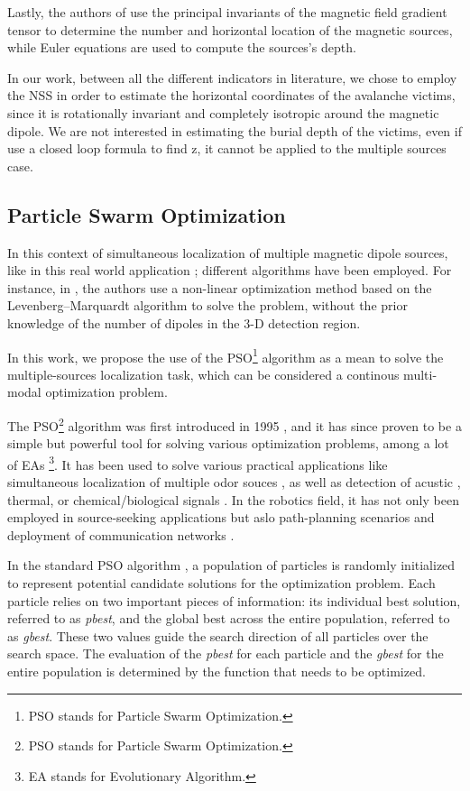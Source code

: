 Lastly, the authors of \cite{multiple_spacecraft} use 
the principal invariants of the magnetic field gradient tensor
to determine the number and horizontal location of the magnetic sources, 
while Euler equations are used to compute the sources's depth.

In our work, between all the different indicators in literature,
we chose to employ the NSS in order to estimate the 
horizontal coordinates of the avalanche victims, 
since it is rotationally invariant and completely isotropic 
around the magnetic dipole.
We are not interested in estimating the burial depth of the victims,
even if \cite{not_import_formula_z} use a closed loop formula to find z,
it cannot be applied to the multiple sources case.


\subsection{Particle Swarm Optimization}
In this context of simultaneous localization of multiple magnetic 
dipole sources, like in this real world application \cite{real_application}; 
different algorithms have been employed.
For instance, in \cite{DetectionMultiplMagnetiDipoleSources}, the authors
use a non-linear optimization method based on the Levenberg–Marquardt algorithm
to solve the problem, without the prior knowledge of the number of 
dipoles in the 3-D detection region.

In this work, we propose the use of the PSO\footnote{PSO stands for Particle Swarm Optimization.} 
algorithm as a mean to solve the multiple-sources localization task, 
which can be considered a continous multi-modal optimization problem.

The PSO\footnote{PSO stands for Particle Swarm Optimization.} algorithm 
was first introduced in 1995 \cite{PSO_original}, and it has since proven to be 
a simple but powerful tool for solving various optimization problems\cite{PSO_IMPORTANT},
among a lot of EAs \footnote{EA stands for Evolutionary Algorithm.}.
It has been used to solve various practical applications like simultaneous
localization of multiple odor souces \cite{12}, as well as detection of acustic 
\cite{PSO_acustic}, thermal, or chemical/biological signals \cite{3}.
In the robotics field, it has not only been employed in source-seeking 
applications but aslo path-planning scenarios \cite{PSO_for_path_planning} and
deployment of communication networks \cite{PSO_for_communication}.

In the standard PSO algorithm \cite{PSO_original}, a population of particles is 
randomly initialized to represent potential candidate solutions for the optimization problem. 
Each particle relies on two important pieces of information: its individual 
best solution, referred to as \textit{pbest}, and the global best across the entire population, 
referred to as \textit{gbest}. These two values guide the search direction of all particles 
over the search space. 
The evaluation of the \textit{pbest} for each particle and the \textit{gbest} for 
the entire population is determined by the function that needs to be optimized.


